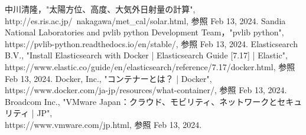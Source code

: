 \begin{thebibliography}{99}

中川清隆，"太陽方位、高度、大気外日射量の計算",\\ http://es.ris.ac.jp/~nakagawa/met\_cal/solar.html, 参照 Feb 13, 2024.
Sandia National Laboratories and pvlib python Development Team，"pvlib python",\\ https://pvlib-python.readthedocs.io/en/stable/, 参照 Feb 13, 2024.
Elasticsearch B.V., "Install Elasticsearch with Docker | Elasticsearch Guide [7.17] | Elastic",\\ https://www.elastic.co/guide/en/elasticsearch/reference/7.17/docker.html, 参照 Feb 13, 2024.
Docker, Inc., "コンテナーとは？ | Docker",\\ https://www.docker.com/ja-jp/resources/what-container/, 参照 Feb 13, 2024.
Broadcom Inc., "VMware Japan：クラウド、モビリティ、ネットワークとセキュリティ | JP",\\ https://www.vmware.com/jp.html, 参照 Feb 13, 2024.
\end{thebibliography}
